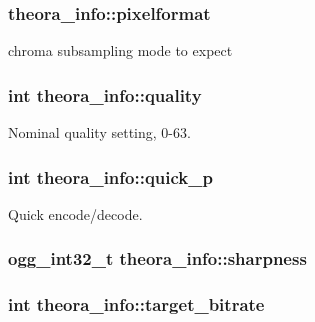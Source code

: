 \subsubsection[{pixelformat}]{ {\bf theora\_\-info::pixelformat}}\label{structtheora__info_a65ab4376ab5242ee82e06c78fb7008ab}


chroma subsampling mode to expect 

\subsubsection[{quality}]{\setlength{\rightskip}{0pt plus 5cm}int {\bf theora\_\-info::quality}}\label{structtheora__info_a71a4748a5f31bd58d0e403b7806c980d}


Nominal quality setting, 0-\/63. 

\subsubsection[{quick\_\-p}]{\setlength{\rightskip}{0pt plus 5cm}int {\bf theora\_\-info::quick\_\-p}}\label{structtheora__info_a2dfae4fd175dbd19254eaf0697778ff5}


Quick encode/decode. 

\subsubsection[{sharpness}]{\setlength{\rightskip}{0pt plus 5cm}ogg\_\-int32\_\-t {\bf theora\_\-info::sharpness}}\label{structtheora__info_a3fb695de2b2f56dd0203b9e2eb0df1cc}
\subsubsection[{target\_\-bitrate}]{\setlength{\rightskip}{0pt plus 5cm}int {\bf theora\_\-info::target\_\-bitrate}}\label{structtheora__info_a0cfba041767ae2416dd190a406afe713}


